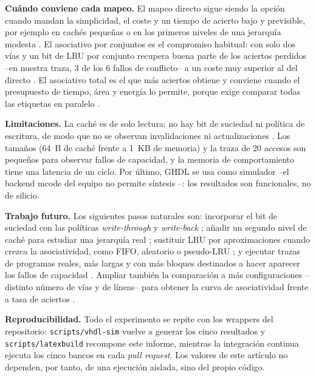 \documentclass[llncs]{llncs}
\begin{document}
\textbf{Cuándo conviene cada mapeo.} El mapeo directo sigue siendo la
opción cuando mandan la simplicidad, el coste y un tiempo de acierto
bajo y previsible, por ejemplo en cachés pequeñas o en los primeros
niveles de una jerarquía modesta \cite{stallings2019,null2024}. El
asociativo por conjuntos es el compromiso habitual: con solo dos vías y
un bit de LRU por conjunto recupera buena parte de los aciertos
perdidos --en nuestra traza, 3 de los 6 fallos de conflicto-- a un
coste muy superior al del directo \cite{hennessy2019,wikipedia-cpu-cache}.
El asociativo total es el que más aciertos obtiene y conviene cuando el
presupuesto de tiempo, área y energía lo permite, porque exige
comparar todas las etiquetas en paralelo \cite{hennessy2019}.

\textbf{Limitaciones.} La caché es de solo lectura: no hay bit de
suciedad ni política de escritura, de modo que no se observan
invalidaciones ni actualizaciones \cite{bryant2015,wikipedia-cache-computing}.
Los tamaños (64~B de caché frente a 1~KB de memoria) y la traza de
20 accesos son pequeños para observar fallos de capacidad, y la
memoria de comportamiento tiene una latencia de un ciclo. Por último,
GHDL se usa como simulador --el backend mcode del equipo no permite
síntesis \cite{ghdl-docs}--: los resultados son funcionales, no de
silicio.

\textbf{Trabajo futuro.} Los siguientes pasos naturales son: incorporar
el bit de suciedad con las políticas \emph{write-through} y
\emph{write-back} \cite{wikipedia-cache-computing,bryant2015,stallings2019};
añadir un segundo nivel de caché para estudiar una jerarquía real
\cite{tanenbaum2013}; sustituir LRU por aproximaciones cuando crezca la
asociatividad, como FIFO, aleatorio o pseudo-LRU \cite{hennessy2019};
y ejecutar trazas de programas reales, más largas y con más bloques
destinados a hacer aparecer los fallos de capacidad
\cite{patterson2017,bryant2015}. Ampliar también la comparación a más
configuraciones --distinto número de vías y de líneas-- para obtener la
curva de asociatividad frente a tasa de aciertos \cite{bryant2015}.

\textbf{Reproducibilidad.} Todo el experimento se repite con los
wrappers del repositorio: \texttt{scripts/\allowbreak vhdl-sim}
vuelve a generar los cinco resultados y
\texttt{scripts/\allowbreak latexbuild} recompone este informe, mientras
la integración continua ejecuta los cinco bancos en
cada \emph{pull request}. Los valores de este artículo no dependen,
por tanto, de una ejecución aislada, sino del propio código.
\end{document}
